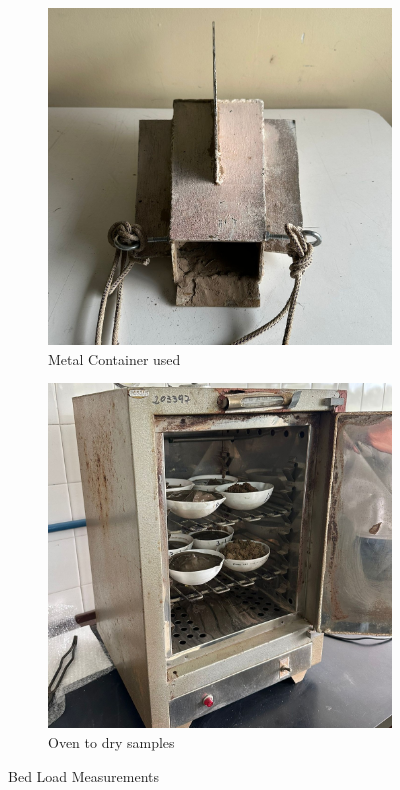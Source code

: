 \begin{figure}[H]
    \begin{subfigure}{0.48\textwidth}
        \centering
        \includegraphics[width=\linewidth]{figures/appendixE/metalcontainer.jpg}
        \caption{Metal Container used}
    \end{subfigure}\hfill
    \begin{subfigure}{0.48\textwidth}
        \centering
        \includegraphics[width=\linewidth]{figures/appendixE/oven.jpg}
        \caption{Oven to dry samples}
    \end{subfigure}

    \caption{Bed Load Measurements}
    \label{fig:bed-load}
\end{figure}


